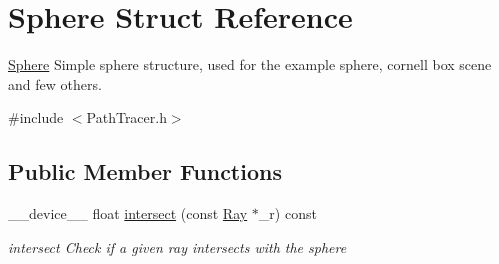 \hypertarget{structSphere}{\section{Sphere Struct Reference}
\label{structSphere}
}


\hyperlink{structSphere}{Sphere} Simple sphere structure, used for the example sphere, cornell box scene and few others.  




{\ttfamily \#include $<$Path\-Tracer.\-h$>$}

\subsection*{Public Member Functions}
\begin{DoxyCompactItemize}
\item 
\-\_\-\-\_\-device\-\_\-\-\_\- float \hyperlink{structSphere_aff7f40563a36da274224cce2df67c5bb}{intersect} (const \hyperlink{structRay}{Ray} $\ast$\-\_\-r) const 
\begin{DoxyCompactList}\small\item\em intersect Check if a given ray intersects with the sphere \end{DoxyCompactList}\end{DoxyCompactItemize}
